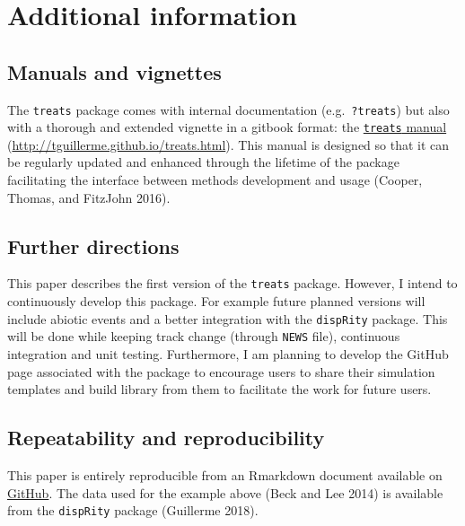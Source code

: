 \documentclass[
]{article}
\begin{document}
\hypertarget{additional-information}{%
\section{Additional information}\label{additional-information}}

\hypertarget{manuals-and-vignettes}{%
\subsection{Manuals and vignettes}\label{manuals-and-vignettes}}

The \texttt{treats} package comes with internal documentation
(e.g.~\texttt{?treats}) but also with a thorough and extended vignette
in a gitbook format: the
\href{http://tguillerme.github.io/treats.html}{\texttt{treats} manual}
(\href{https://anonymous.4open.science/r/treats-006B}{http://tguillerme.github.io/treats.html}).
This manual is designed so that it can be regularly updated and enhanced
through the lifetime of the package facilitating the interface between
methods development and usage (Cooper, Thomas, and FitzJohn 2016).

\hypertarget{further-directions}{%
\subsection{Further directions}\label{further-directions}}

This paper describes the first version of the \texttt{treats} package.
However, I intend to continuously develop this package. For example
future planned versions will include abiotic events and a better
integration with the \texttt{dispRity} package. This will be done while
keeping track change (through \texttt{NEWS} file), continuous
integration and unit testing. Furthermore, I am planning to develop the
GitHub page associated with the package to encourage users to share
their simulation templates and build library from them to facilitate the
work for future users.

\hypertarget{repeatability-and-reproducibility}{%
\subsection{Repeatability and
reproducibility}\label{repeatability-and-reproducibility}}

This paper is entirely reproducible from an Rmarkdown document available
on \href{https://github.com/TGuillerme/treats/inst/paper.Rmd}{GitHub}.
The data used for the example above (Beck and Lee 2014) is available
from the \texttt{dispRity} package (Guillerme 2018).
\end{document}
